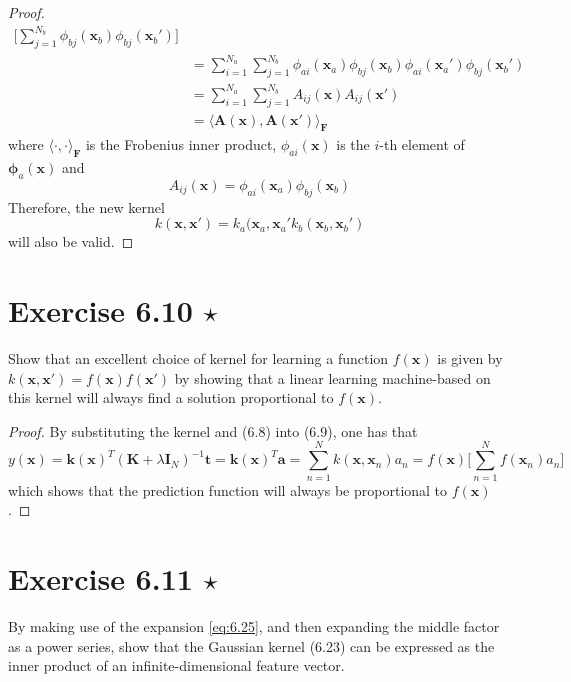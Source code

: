 \begin{proof}
\begin{align*}
        \bigg[\sum_{j=1}^{N_b} \phi_{bj}(\mathbf{x}_b) \phi_{bj}(\mathbf{x}_b')\bigg] \\
        &= \sum_{i=1}^{N_a} \sum_{j=1}^{N_b}
        \phi_{ai}(\mathbf{x}_a) \phi_{bj}(\mathbf{x}_b)
        \phi_{ai}(\mathbf{x}_a') \phi_{bj}(\mathbf{x}_b') \\
        &= \sum_{i=1}^{N_a} \sum_{j=1}^{N_b} A_{ij}(\mathbf{x}) A_{ij}(\mathbf{x}') \\
        &= \langle \mathbf{A}(\mathbf{x}), \mathbf{A}(\mathbf{x}') \rangle_\bm{F}
    \end{align*}
    where $\langle \cdot, \cdot \rangle_\bm{F}$ is the Frobenius inner product,
    $\phi_{ai}(\mathbf{x})$ is the $i$-th element of $\bm{\phi}_a(\mathbf{x})$ and
    \[
        A_{ij}(\mathbf{x}) = \phi_{ai}(\mathbf{x}_a) \phi_{bj}(\mathbf{x}_b)
    \] 
    Therefore, the new kernel
    \begin{equation}\label{eq:6.22}\tag{6.22}
        k(\mathbf{x}, \mathbf{x}') = 
        k_a(\mathbf{x}_a, \mathbf{x}_a' k_b(\mathbf{x}_b, \mathbf{x}_b')
    \end{equation}
    will also be valid.
\end{proof}

\section*{Exercise 6.10 $\star$}
Show that an excellent choice of kernel for learning a function
$f(\mathbf{x})$ is given by $k(\mathbf{x}, \mathbf{x}') = f(\mathbf{x})f(\mathbf{x}')$
by showing that a linear learning machine-based on this kernel will always find a solution
proportional to $f(\mathbf{x})$.

\vspace{1em}

\begin{proof}
    By substituting the kernel and (6.8) into (6.9), one has that
    \[
        y(\mathbf{x}) 
        = \mathbf{k}(\mathbf{x})^T(\mathbf{K} + \lambda \mathbf{I}_N)^{-1} \mathbf{t}
        = \mathbf{k}(\mathbf{x})^T \mathbf{a}
        = \sum_{n=1}^{N} k(\mathbf{x}, \mathbf{x}_n) a_n
        = f(\mathbf{x}) \bigg[\sum_{n=1}^{N} f(\mathbf{x}_n) a_n\bigg]
    \] 
    which shows that the prediction function will always be proportional
    to $f(\mathbf{x})$.
\end{proof}

\section*{Exercise 6.11 $\star$}
By making use of the expansion \eqref{eq:6.25}, and then expanding
the middle factor as a power series, show that the Gaussian kernel
(6.23) can be expressed as the inner product
of an infinite-dimensional feature vector.

